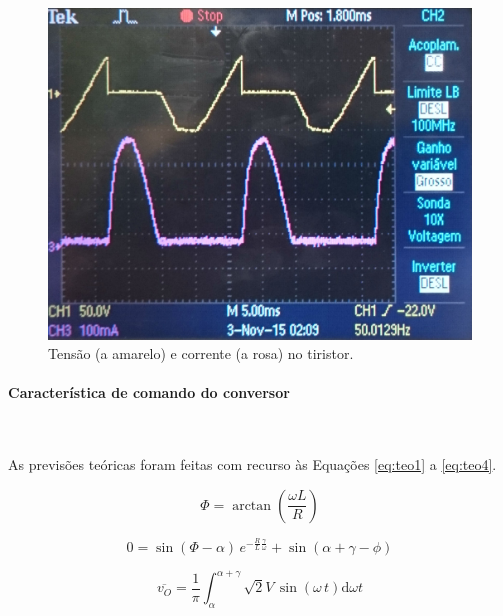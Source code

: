 \documentclass[a4paper,11pt]{article}
\numberwithin{equation}{section}
\begin{document}
\begin{figure}[H]
	\centering
	\includegraphics[keepaspectratio=true, scale=0.15]{img/DSC_0185}
	\caption{Tensão (a amarelo) e corrente (a rosa) no tiristor.}
	\label{fig:tctiristorlacuna}
	\vspace{-0.8em}
\end{figure}


\paragraph{Característica de comando do conversor} \mbox{}\

As previsões teóricas foram feitas com recurso às Equações \ref{eq:teo1} a \ref{eq:teo4}.

\begin{equation}
\label{eq:teo1}
\Phi = \arctan{(\frac{\omega L}{R})}
\end{equation}

\begin{equation}
\label{eq:teo2}
0 = \sin{(\Phi - \alpha)}\,e^{-\frac{R}{L}\frac{\gamma}{\omega}}+\sin{(\alpha + \gamma - \phi)}
\end{equation}

\begin{equation}
\label{eq:teo3}
\overline{v_O} = \frac{1}{\pi} \int_\alpha^{\alpha+\gamma} \sqrt{2}V\,\sin{(\omega\,t)} \mathrm{d}\omega t
\end{equation}
\end{document}
